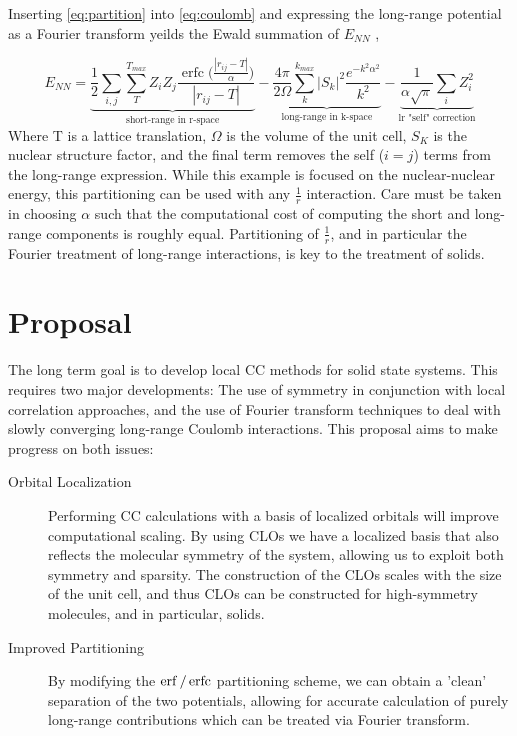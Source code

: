 \documentclass[letterpaper, 12pt]{article}
\DeclareMathOperator\erfc{erfc}
\begin{document}
Inserting \eqref{eq:partition} into \eqref{eq:coulomb} and expressing the long-range potential as a Fourier transform yeilds the Ewald summation of $E_{NN}$\cite{Ewald} , 

\begin{equation}
E_{NN} =\underbrace{\frac{1}{2}\sum_{i,j}  \sum_T^{T_{max}} Z_i Z_j  \frac{\erfc\big(\frac{|r_{ij}-T|}{\alpha}\big)}{|r_{ij}-T|}}_{\text{short-range in r-space}} -  \underbrace{\frac{4 \pi}{2 \Omega} \sum^{k_{max}}_k |S_k|^2 \frac{e^{-k^2\alpha^2}}{k^2}}_{\text{long-range in k-space}} -\underbrace{\frac{1}{\alpha \sqrt{\pi}} \sum_i Z^2_i}_{\text{lr "self" correction}}
\end{equation}
Where T is a lattice translation, $\Omega$ is the volume of the unit cell, $S_K$ is the nuclear structure factor, and the final term removes the self ($i=j$) terms from the long-range expression. While this example is focused on the nuclear-nuclear energy, this partitioning can be used with any $\frac{1}{r}$ interaction. Care must be taken in choosing $\alpha$ such that the computational cost of computing the short and long-range components is roughly equal. Partitioning of $\frac{1}{r}$, and in particular the Fourier treatment of long-range interactions, is key to the treatment of solids. 
\label{subsubsec:Partitioning}

\section{Proposal}
The long term goal is to develop local CC methods for solid state systems. This requires two major developments: The use of symmetry in conjunction with local correlation approaches, and the use of Fourier transform techniques to deal with slowly converging long-range Coulomb interactions. This proposal aims to make progress on both issues:

\begin{description}
\item[Orbital Localization] Performing CC calculations with a basis of localized orbitals will improve computational scaling. By using CLOs we have a localized basis that also reflects the molecular symmetry of the system, allowing us to exploit both symmetry and sparsity. The construction of the CLOs scales with the size of the unit cell, and thus CLOs can be constructed for high-symmetry molecules, and in particular, solids.
\item[Improved Partitioning] By modifying the $\erf/\erfc$  partitioning scheme, we can obtain a 'clean' separation of the two potentials, allowing for accurate calculation of purely long-range contributions which can be treated via Fourier transform.
\end{description}
\end{document}
